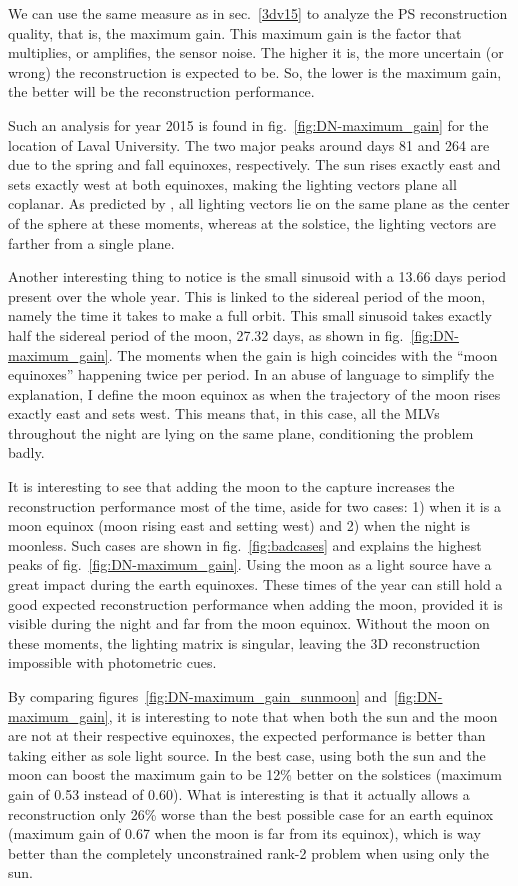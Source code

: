 We can use the same measure as in sec.~\ref{3dv15} to analyze the PS reconstruction quality, that is, the maximum gain. This maximum gain is the factor that multiplies, or amplifies, the sensor noise. The higher it is, the more uncertain (or wrong) the reconstruction is expected to be. So, the lower is the maximum gain, the better will be the reconstruction performance.

Such an analysis for year 2015 is found in fig.~\ref{fig:DN-maximum_gain} for the location of Laval University. The two major peaks around days 81 and 264 are due to the spring and fall equinoxes, respectively. The sun rises exactly east and sets exactly west at both equinoxes, making the lighting vectors plane all coplanar. As predicted by \cite{shen-pg-14}, all lighting vectors lie on the same plane as the center of the sphere at these moments, whereas at the solstice, the lighting vectors are farther from a single plane.

Another interesting thing to notice is the small sinusoid with a 13.66 days period present over the whole year. This is linked to the sidereal period of the moon, namely the time it takes to make a full orbit. This small sinusoid takes exactly half the sidereal period of the moon, 27.32 days, as shown in fig.~\ref{fig:DN-maximum_gain}. The moments when the gain is high coincides with the ``moon equinoxes'' happening twice per period. In an abuse of language to simplify the explanation, I define the moon equinox as when the trajectory of the moon rises exactly east and sets west. This means that, in this case, all the MLVs throughout the night are lying on the same plane, conditioning the problem badly.

It is interesting to see that adding the moon to the capture increases the reconstruction performance most of the time, aside for two cases: 1) when it is a moon equinox (moon rising east and setting west) and 2) when the night is moonless. Such cases are shown in fig.~\ref{fig:badcases} and explains the highest peaks of fig.~\ref{fig:DN-maximum_gain}. Using the moon as a light source have a great impact during the earth equinoxes. These times of the year can still hold a good expected reconstruction performance when adding the moon, provided it is visible during the night and far from the moon equinox. Without the moon on these moments, the lighting matrix is singular, leaving the 3D reconstruction impossible with photometric cues.

By comparing figures~\ref{fig:DN-maximum_gain_sunmoon} and~\ref{fig:DN-maximum_gain}, it is interesting to note that when both the sun and the moon are not at their respective equinoxes, the expected performance is better than taking either as sole light source. In the best case, using both the sun and the moon can boost the maximum gain to be 12\% better on the solstices (maximum gain of 0.53 instead of 0.60). What is interesting is that it actually allows a reconstruction only 26\% worse than the best possible case for an earth equinox (maximum gain of 0.67 when the moon is far from its equinox), which is way better than the completely unconstrained rank-2 problem when using only the sun.

